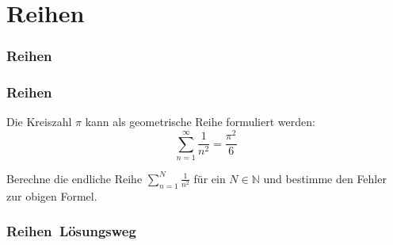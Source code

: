 \def\stitle{Reihen}
\section{\stitle}
\begin{frame}
  \frametitle{\stitle}%
\tableofcontents[current]
\end{frame}

\begin{frame}[t]%
    \frametitle{\stitle}

Die Kreiszahl $\pi$ kann als geometrische Reihe formuliert werden:
$$
\sum_{n=1}^\infty  \frac{1}{n^2} = \frac{\pi^2}{6}
$$

Berechne die endliche Reihe $\sum_{n=1}^N \frac{1}{n^2}$ für ein $N\in\mathbb{N}$ und bestimme den Fehler zur obigen Formel.

\pause

\end{frame}


\begin{frame}[fragile]%
 \frametitle{\stitle\ Lösungsweg}%

\end{frame}
